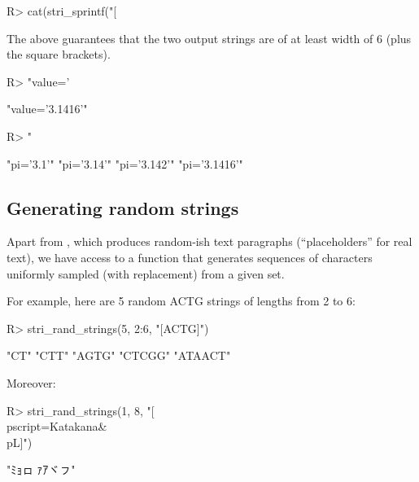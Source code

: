 \documentclass[nojss]{jss}
\begin{document}
\begin{Schunk}
\begin{Sinput}
R> cat(stri_sprintf("[%6s]", c("abcd", "\u200b\u200b\u200bąß²€")), sep="\n")
\end{Sinput}
\begin{Soutput}
[  abcd]
[  ​​​ąß²€]
\end{Soutput}
\end{Schunk}

The above guarantees that the two output strings are
of at least width of 6 (plus the square brackets).


\ifnotJSSversion
\begin{Schunk}
\begin{Sinput}
R> "value='%.4f'" %s$% pi  # equivalently: "value='%.4f'" %s$% list(pi)
\end{Sinput}
\begin{Soutput}
[1] "value='3.1416'"
\end{Soutput}
\begin{Sinput}
R> "%s='%.*3$f'" %s$% list("pi", pi, 1:4)
\end{Sinput}
\begin{Soutput}
[1] "pi='3.1'"    "pi='3.14'"   "pi='3.142'"  "pi='3.1416'"
\end{Soutput}
\end{Schunk}
\fi

\subsection{Generating random strings}

Apart from ,
which produces random-ish text paragraphs (``placeholders'' for real text),
we have access to a function that generates sequences of characters
uniformly sampled (with replacement) from a given set.

For example, here are 5 random ACTG strings of lengths from 2 to 6:

\begin{Schunk}
\begin{Sinput}
R> stri_rand_strings(5, 2:6, "[ACTG]")
\end{Sinput}
\begin{Soutput}
[1] "CT"     "CTT"    "AGTG"   "CTCGG"  "ATAACT"
\end{Soutput}
\end{Schunk}

\ifnotJSSversion
Moreover:

\begin{Schunk}
\begin{Sinput}
R> stri_rand_strings(1, 8, "[\\p{script=Katakana}&\\p{L}]")
\end{Sinput}
\begin{Soutput}
[1] "ﾐｮㇿ𛅧ｧｱヾㇷ"
\end{Soutput}
\end{Schunk}
\fi
\end{document}
